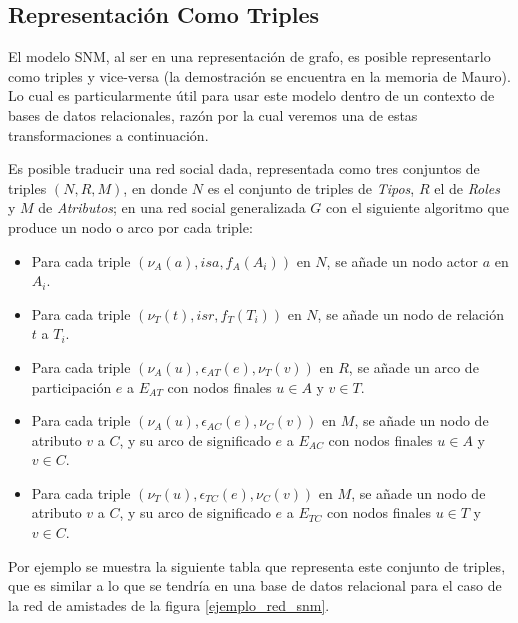 
\subsection{Representación Como Triples} %
\label{sub:representacion_como_triples}

El modelo SNM, al ser en una representación de grafo, es posible representarlo como triples y vice-versa (la demostración se encuentra en la memoria de Mauro\cite{tesismauro}). Lo cual es particularmente útil para usar este modelo dentro de un contexto de bases de datos relacionales, razón por la cual veremos una de estas transformaciones a continuación.

Es posible traducir una red social dada, representada como tres conjuntos de triples $(N, R, M)$, en donde $N$ es el conjunto de triples de \emph{Tipos}, $R$ el de \emph{Roles} y $M$ de \emph{Atributos}; en una red social generalizada $G$ con el siguiente algoritmo que produce un nodo o arco por cada triple:

\begin{itemize}
  \item Para cada triple $(\nu_A(a), isa, f_A(A_i))$ en $N$, se añade un nodo actor $a$ en $A_i$.
  \item Para cada triple $(\nu_T(t), isr, f_T(T_i))$ en $N$, se añade un nodo de relación $t$ a $T_i$.
  \item Para cada triple $(\nu_A(u), \epsilon_{AT}(e), \nu_T(v))$ en $R$, se añade un arco de participación $e$ a $E_{AT}$ con nodos finales $u \in A$ y $v \in T$.
  \item Para cada triple $(\nu_A(u), \epsilon_{AC}(e), \nu_C(v))$ en $M$, se añade un nodo de atributo $v$ a $C$, y su arco de significado $e$ a $E_{AC}$ con nodos finales $u \in A$ y $v \in C$.
  \item Para cada triple $(\nu_T(u), \epsilon_{TC}(e), \nu_C(v))$ en $M$, se añade un nodo de atributo $v$ a $C$, y su arco de significado $e$ a $E_{TC}$ con nodos finales $u \in T$ y $v \in C$.
\end{itemize}

Por ejemplo se muestra la siguiente tabla que representa este conjunto de triples, que es similar a lo que se tendría en una base de datos relacional para el caso de la red de amistades de la figura \ref{ejemplo_red_snm}.

